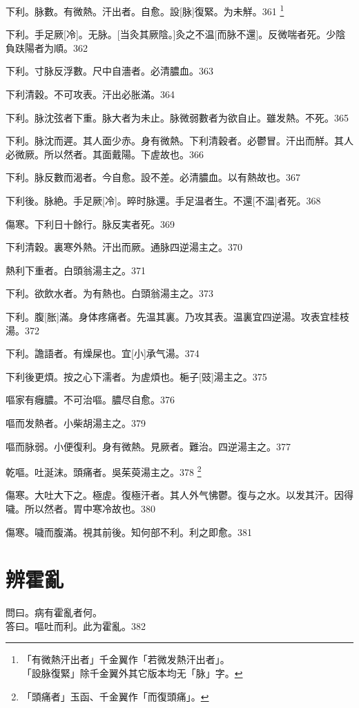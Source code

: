 \documentclass[12pt,twoside,UTF8,b5paper]{ctexbook}
\begin{document}
下利。脉數。有微熱。汗出者。自愈。設[脉]復緊。为未觧。361
	\footnote{「有微熱汗出者」千金翼作「若微发熱汗出者」。\\「設脉復緊」除千金翼外其它版本均无「脉」字。}

下利。手足厥[冷]。无脉。[当灸其厥陰。]灸之不温[而脉不還]。反微喘者死。少陰負趺陽者为順。362

下利。寸脉反浮數。尺中自濇者。必清膿血。363

下利清穀。不可攻表。汗出必胀滿。364

下利。脉沈弦者下重。脉大者为未止。脉微弱數者为欲自止。雖发熱。不死。365

下利。脉沈而遲。其人面少赤。身有微熱。下利清穀者。必鬱冒。汗出而觧。其人必微厥。所以然者。其面戴陽。下虗故也。366

下利。脉反數而渴者。今自愈。設不差。必清膿血。以有熱故也。367

下利後。脉絶。手足厥[冷]。晬时脉還。手足温者生。不還[不温]者死。368

傷寒。下利日十餘行。脉反実者死。369

下利清穀。裏寒外熱。汗出而厥。通脉四逆湯主之。370

熱利下重者。白頭翁湯主之。371

下利。欲飲水者。为有熱也。白頭翁湯主之。373

下利。腹[胀]滿。身体疼痛者。先温其裏。乃攻其表。温裏宜四逆湯。攻表宜桂枝湯。372

下利。譫語者。有燥屎也。宜[小]承气湯。374

下利後更煩。按之心下濡者。为虗煩也。梔子[豉]湯主之。375

嘔家有癰膿。不可治嘔。膿尽自愈。376

嘔而发熱者。小柴胡湯主之。379

嘔而脉弱。小便復利。身有微熱。見厥者。難治。四逆湯主之。377

乾嘔。吐涎沫。頭痛者。吳茱萸湯主之。378
	\footnote{「頭痛者」玉函、千金翼作「而復頭痛」。}

傷寒。大吐大下之。極虗。復極汗者。其人外气怫鬱。復与之水。以发其汗。因得噦。所以然者。胃中寒冷故也。380

傷寒。噦而腹滿。視其前後。知何部不利。利之即愈。381

\chapter{辨霍亂}

問曰。病有霍亂者何。\\
答曰。嘔吐而利。此为霍亂。382
\end{document}
